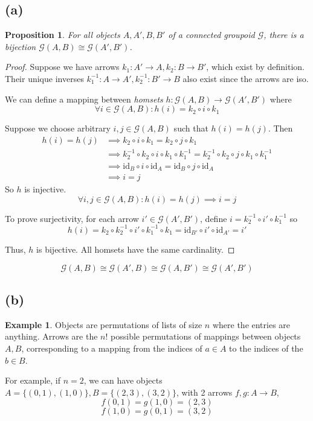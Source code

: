 \documentclass[11pt]{article} %
\newtheorem{proposition}[theorem]{Proposition}
\theoremstyle{definition}
\newtheorem{example}[theorem]{Example}
\begin{document}
\subsection*{(a)}
\begin{proposition}
    For all objects $A,A',B,B'$ of a connected groupoid $\mathcal{G}$, 
    there is a bijection $\mathcal{G}(A,B)\cong\mathcal{G}(A',B')$.
\end{proposition}
\begin{proof}
    Suppose we have arrows $k_1:A'\rightarrow A,k_2:B \rightarrow B'$, which exist by definition.
    Their unique inverses $k_1^{-1}:A\rightarrow A',k_2^{-1}:B' \rightarrow B$ also exist since the arrows are iso.

    We can define a mapping between \textit{homsets} $h:\mathcal{G}(A,B)\rightarrow \mathcal{G}(A',B')$ where
    \[\forall i\in\mathcal{G}(A,B):h(i)=k_2\circ i\circ k_1\]

    Suppose we choose arbitrary $i,j \in \mathcal{G}(A,B)$ such that $h(i)=h(j)$. Then
\begin{equation}
\begin{aligned}
    h(i)=h(j) &\implies k_2\circ i \circ k_1 = k_2\circ j\circ k_1\\
    &\implies k_2^{-1}\circ k_2\circ i \circ k_1 \circ k_1^{-1}= k_2^{-1}\circ k_2\circ j\circ k_1\circ k_1^{-1}\\
    &\implies \text{id}_B\circ i \circ \text{id}_A = \text{id}_B\circ j\circ \text{id}_A\\
    &\implies i=j
\end{aligned}
\end{equation}
    So $h$ is injective.
    \[\forall i,j \in \mathcal{G}(A,B):h(i)=h(j) \implies i=j\]

    To prove surjectivity, for each arrow $i'\in\mathcal{G}(A',B')$, define $i=k_2^{-1}\circ i' \circ k_1^{-1}$ so
    \[h(i)=k_2\circ k_2^{-1}\circ i' \circ k_1^{-1} \circ k_1 
    = \text{id}_{B'}\circ i' \circ \text{id}_{A'} = i'\]

    Thus, $h$ is bijective. All homsets have the same cardinality.
\end{proof}

{\color{teal}
\[\mathcal{G}(A,B)\cong\mathcal{G}(A',B)\cong\mathcal{G}(A,B')\cong\mathcal{G}(A',B')\]
}

\subsection*{(b)}
\begin{example}
    
Objects are permutations of lists of size $n$ where the entries are anything.
Arrows are the $n!$ possible permutations of mappings between objects $A,B$, 
corresponding to a mapping from the indices of $a\in A$ to the indices of the $b\in B$.

For example, if $n=2$, we can have objects $A=\{(0,1),(1,0)\},B=\{(2,3),(3,2)\}$,
with 2 arrows $f,g:A\rightarrow B$, 
\[f(0,1)=g(1,0)=(2,3)\]
\[f(1,0)=g(0,1)=(3,2)\]
\end{example}
\end{document}
